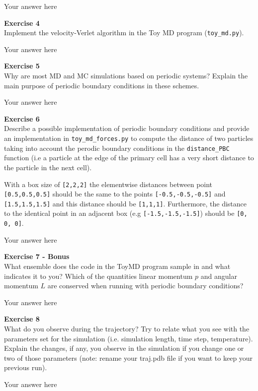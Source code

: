 \documentclass{article}
\begin{document}
Your answer here

\begin{mdframed}
\textbf{Exercise 4}\\
Implement the velocity-Verlet algorithm in the Toy MD program (\texttt{toy\_md.py}).
\end{mdframed}

Your answer here

\begin{mdframed}
\textbf{Exercise 5}\\
Why are most MD and MC simulations based on periodic systems? Explain the main purpose of periodic boundary conditions in these schemes.
\end{mdframed}

Your answer here

\begin{mdframed}
\textbf{Exercise 6}\\
Describe a possible implementation of periodic boundary conditions and provide an implementation in \texttt{toy\_md\_forces.py} to compute the distance of two particles taking into account the perodic boundary conditions in the \texttt{distance\_PBC} function (i.e a particle at the edge of the primary cell has a very short distance to the particle in the next cell).

With a box size of \texttt{[2,2,2]} the elementwise distances between point \texttt{[0.5,0.5,0.5]} should be the same to the points \texttt{[-0.5,-0.5,-0.5]} and \texttt{[1.5,1.5,1.5]} and this distance should be \texttt{[1,1,1]}. Furthermore, the distance to the identical point in an adjacent box (e.g \texttt{[-1.5,-1.5,-1.5]}) should be \texttt{[0, 0, 0]}.
\end{mdframed}

Your answer here

\begin{mdframed}
\textbf{Exercise 7 - Bonus}\\
What ensemble does the code in the ToyMD program sample in and what indicates it to you? Which of the quantities linear momentum $p$ and angular momentum $L$ are conserved when running with periodic boundary conditions?
\end{mdframed}

Your answer here

\begin{mdframed}
\textbf{Exercise 8}\\
What do you observe during the trajectory? Try to relate what you see with the parameters set for the simulation (i.e. simulation length, time step, temperature). Explain the changes, if any, you observe in the simulation if you change one or two of those parameters (note: rename your traj.pdb file if you want to keep your previous run).
\end{mdframed}

Your answer here
\end{document}
